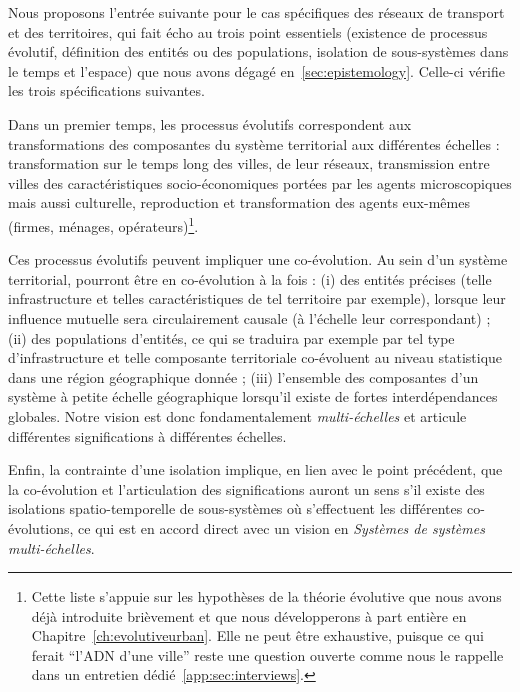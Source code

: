 Nous proposons l'entrée suivante pour le cas spécifiques des réseaux de transport et des territoires, qui fait écho au trois point essentiels (existence de processus évolutif, définition des entités ou des populations, isolation de sous-systèmes dans le temps et l'espace) que nous avons dégagé en~\ref{sec:epistemology}. Celle-ci vérifie les trois spécifications suivantes.

Dans un premier temps, les processus évolutifs correspondent aux transformations des composantes du système territorial aux différentes échelles : transformation sur le temps long des villes, de leur réseaux, transmission entre villes des caractéristiques socio-économiques portées par les agents microscopiques mais aussi culturelle, reproduction et transformation des agents eux-mêmes (firmes, ménages, opérateurs)\footnote{Cette liste s'appuie sur les hypothèses de la théorie évolutive que nous avons déjà introduite brièvement et que nous développerons à part entière en Chapitre~\ref{ch:evolutiveurban}. Elle ne peut être exhaustive, puisque ce qui ferait ``l'ADN d'une ville'' reste une question ouverte comme nous le rappelle  dans un entretien dédié~\ref{app:sec:interviews}.}.

Ces processus évolutifs peuvent impliquer une co-évolution. Au sein d'un système territorial, pourront être en co-évolution à la fois : (i) des entités précises (telle infrastructure et telles caractéristiques de tel territoire par exemple), lorsque leur influence mutuelle sera circulairement causale (à l'échelle leur correspondant) ; (ii) des populations d'entités, ce qui se traduira par exemple par tel type d'infrastructure et telle composante territoriale co-évoluent au niveau statistique dans une région géographique donnée ; (iii) l'ensemble des composantes d'un système à petite échelle géographique lorsqu'il existe de fortes interdépendances globales. Notre vision est donc fondamentalement \emph{multi-échelles} et articule différentes significations à différentes échelles.


Enfin, la contrainte d'une isolation implique, en lien avec le point précédent, que la co-évolution et l'articulation des significations auront un sens s'il existe des isolations spatio-temporelle de sous-systèmes où s'effectuent les différentes co-évolutions, ce qui est en accord direct avec un vision en \emph{Systèmes de systèmes multi-échelles}.



